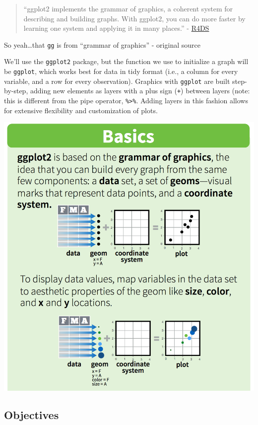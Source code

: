 \documentclass[]{book}
\begin{document}
\begin{quote}
``ggplot2 implements the grammar of graphics, a coherent system for describing and building graphs. With ggplot2, you can do more faster by learning one system and applying it in many places.'' - \href{http://r4ds.had.co.nz/data-visualisation.html}{R4DS}
\end{quote}

So yeah\ldots{}that \texttt{gg} is from ``grammar of graphics'' - original source

We'll use the \texttt{ggplot2} package, but the function we use to initialize a graph will be \texttt{ggplot}, which works best for data in tidy format (i.e., a column for every variable, and a row for every observation). Graphics with \texttt{ggplot} are built step-by-step, adding new elements as layers with a plus sign (\texttt{+}) between layers (note: this is different from the pipe operator, \texttt{\%\textgreater{}\%}. Adding layers in this fashion allows for extensive flexibility and customization of plots.

\includegraphics{img/rstudio-cheatsheet-ggplot.png}

\hypertarget{objectives-3}{%
\subsection{Objectives}\label{objectives-3}}
\end{document}
